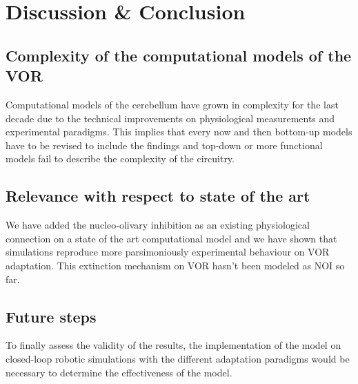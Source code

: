 \documentclass[12pt, a4paper,twoside]{tesi_upf}
\begin{document}
\chapter{Discussion \& Conclusion}

\section{Complexity of the computational models of the VOR}

Computational models of the cerebellum have grown in complexity for the last decade due to the technical improvements on physiological measurements and experimental paradigms. This implies that every now and then bottom-up models have to be revised to include the findings and top-down or more functional models fail to describe the complexity of the circuitry.

\section{Relevance with respect to state of the art}

We have added the nucleo-olivary inhibition as an existing physiological connection on a state of the art computational model and we have shown that simulations reproduce more parsimoniously experimental behaviour on VOR adaptation. This extinction mechanism on VOR hasn't been modeled as NOI so far.

\section{Future steps}

To finally assess the validity of the results, the implementation of the model on closed-loop robotic simulations with the different adaptation paradigms would be necessary to determine the effectiveness of the model.
\end{document}
